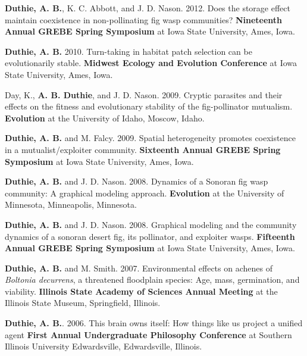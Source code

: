 \documentclass[letterpaper]{article}
\renewenvironment{itemize}{
  \begin{list}{}{
    \setlength{\leftmargin}{1.5em}
  }
}{
  \end{list}
}
\begin{document}
\begin{itemize}
\item {\bf Duthie, A. B.}, K. C. Abbott, and J. D. Nason. 2012. Does the storage effect maintain coexistence in non-pollinating fig wasp communities? {\bf Nineteenth Annual GREBE Spring Symposium} at Iowa State University, Ames, Iowa.
\item {\bf Duthie, A. B.} 2010. Turn-taking in habitat patch selection can be evolutionarily stable. {\bf Midwest Ecology and Evolution Conference} at Iowa State University, Ames, Iowa.
\item Day, K., {\bf A. B. Duthie}, and J. D. Nason. 2009. Cryptic parasites and their effects on the fitness and evolutionary stability of the fig-pollinator mutualism. {\bf Evolution} at the University of Idaho, Moscow, Idaho.
\item {\bf Duthie, A. B.} and M. Falcy. 2009. Spatial heterogeneity promotes coexistence in a mutualist/exploiter community. {\bf Sixteenth Annual GREBE Spring Symposium} at Iowa State University, Ames, Iowa.
\item {\bf Duthie, A. B.} and J. D. Nason. 2008. Dynamics of a Sonoran fig wasp community: A graphical modeling approach. {\bf Evolution} at the University of Minnesota, Minneapolis, Minnesota.
\item {\bf Duthie, A. B.} and J. D. Nason. 2008. Graphical modeling and the community dynamics of a sonoran desert fig, its pollinator, and exploiter wasps. {\bf Fifteenth Annual GREBE Spring Symposium} at Iowa State University, Ames, Iowa.
\item {\bf Duthie, A. B.} and M. Smith. 2007. Environmental effects on achenes of {\it Boltonia decurrens}, a threatened floodplain species: Age, mass, germination, and viability. {\bf Illinois State Academy of Sciences Annual Meeting} at the Illinois State Museum, Springfield, Illinois.
\item {\bf Duthie, A. B.}. 2006. This brain owns itself: How things like us project a unified agent {\bf First Annual Undergraduate Philosophy Conference} at Southern Illinois University Edwardsville, Edwardsville, Illinois.
\end{itemize}
\end{document}
